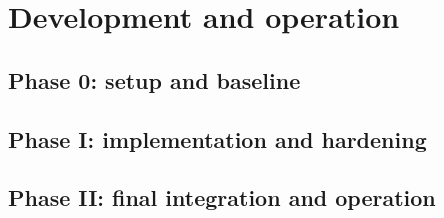 \section{Development and operation}
\subsection{Phase 0: setup and baseline}
\subsection{Phase I: implementation and hardening}
\subsection{Phase II: final integration and operation}
